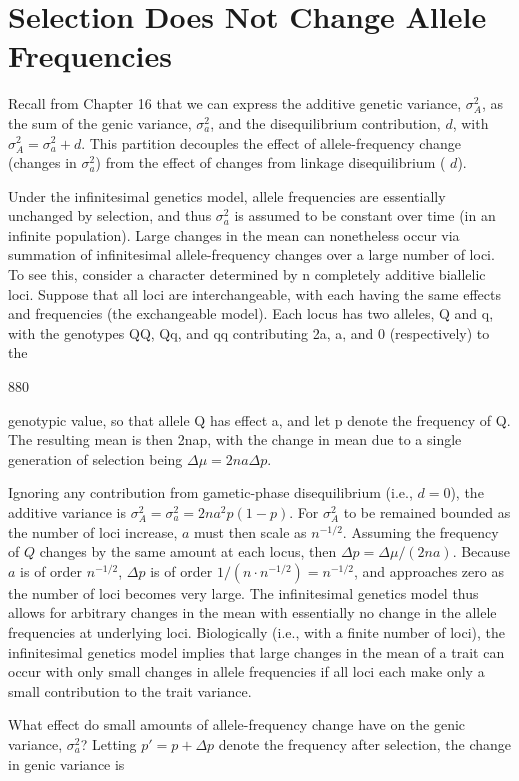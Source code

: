 \documentclass{article}
\begin{document}
\section{Selection Does Not Change Allele Frequencies}
Recall from Chapter 16 that we can express the additive genetic variance,  $ \sigma_A^2 $, as the sum of the genic variance,  $ \sigma_a^2 $, and the disequilibrium contribution,  $ d $, with  $ \sigma_A^2 = \sigma_a^2 + d $. This partition decouples the effect of allele-frequency change (changes in  $ \sigma_a^2 $) from the effect of changes from linkage disequilibrium ( $ d $).

Under the infinitesimal genetics model, allele frequencies are essentially unchanged by selection, and thus  $ \sigma_{a}^{2} $ is assumed to be constant over time (in an infinite population). Large changes in the mean can nonetheless occur via summation of infinitesimal allele-frequency changes over a large number of loci. To see this, consider a character determined by n completely additive biallelic loci. Suppose that all loci are interchangeable, with each having the same effects and frequencies (the exchangeable model). Each locus has two alleles, Q and q, with the genotypes QQ, Qq, and qq contributing 2a, a, and 0 (respectively) to the

880

genotypic value, so that allele Q has effect a, and let p denote the frequency of Q. The resulting mean is then 2nap, with the change in mean due to a single generation of selection being  $ \Delta\mu = 2na\Delta p $.

Ignoring any contribution from gametic-phase disequilibrium (i.e., $d=0$), the additive variance is $\sigma_A^2 = \sigma_a^2 = 2na^2p(1-p)$. For $\sigma_A^2$ to be remained bounded as the number of loci increase, $a$ must then scale as $n^{-1/2}$. Assuming the frequency of $Q$ changes by the same amount at each locus, then $\Delta p = \Delta\mu/(2na)$. Because $a$ is of order $n^{-1/2}$, $\Delta p$ is of order $1/(n \cdot n^{-1/2}) = n^{-1/2}$, and approaches zero as the number of loci becomes very large. The infinitesimal genetics model thus allows for arbitrary changes in the mean with essentially no change in the allele frequencies at underlying loci. Biologically (i.e., with a finite number of loci), the infinitesimal genetics model implies that large changes in the mean of a trait can occur with only small changes in allele frequencies if all loci each make only a small contribution to the trait variance.

What effect do small amounts of allele-frequency change have on the genic variance,  $ \sigma_{a}^{2} $? Letting  $ p' = p + \Delta p $ denote the frequency after selection, the change in genic variance is
\end{document}
